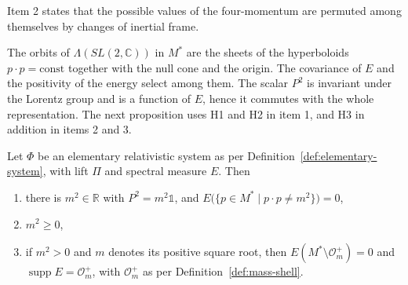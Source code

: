 \noindent Item 2 states that the possible values of the four-momentum are permuted among themselves by changes of inertial frame.

The orbits of $\Lambda(SL(2,\mathbb{C}))$ in $M^*$ are the sheets of the hyperboloids $p\cdot p=\mathrm{const}$ together with the null cone and the origin. The covariance of $E$ and the positivity of the energy select among them. The scalar $P^2$ is invariant under the Lorentz group and is a function of $E$, hence it commutes with the whole representation. The next proposition uses H1 and H2 in item 1, and H3 in addition in items 2 and 3.

\begin{proposition}\label{prop:mass-shell}
	Let $\Phi$ be an elementary relativistic system as per Definition~\ref{def:elementary-system}, with lift $\Pi$ and spectral measure $E$. Then
	\begin{enumerate}
		\item there is $m^2\in\mathbb{R}$ with $P^2=m^2\mathbb{1}$, and $E\big(\{p\in M^*\mid p\cdot p\neq m^2\}\big)=0$,
		\item $m^2\geq0$,
		\item if $m^2>0$ and $m$ denotes its positive square root, then $E(M^*\setminus\mathcal{O}_m^+)=0$ and $\operatorname{supp}E=\mathcal{O}_m^+$, with $\mathcal{O}_m^+$ as per Definition~\ref{def:mass-shell}.
	\end{enumerate}
\end{proposition}


